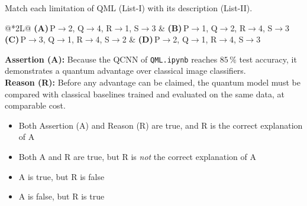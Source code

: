 \documentclass[11pt,a4paper]{article}
\newcommand{\optlabel}[1]{\textbf{(#1)}}
\newenvironment{qitem}[1]{\begin{list}{}{\setlength{\leftmargin}{3.3em}\setlength{\labelwidth}{3.1em}%
  \setlength{\labelsep}{0.2em}\setlength{\topsep}{3pt}\setlength{\parsep}{3pt}}\item[\textbf{Q.#1}\hfill]}{\end{list}}
\newcommand{\qsep}{\par\vspace{2pt}{\color{black!15}\hrule}\vspace{4pt}}
\begin{document}
\begin{qitem}{76}
Match each limitation of QML (List-I) with its description (List-II).
\par\smallskip{}
\par\smallskip\noindent\begin{tabularx}{\linewidth}{@{}*{2}{L}@{}}
\optlabel{A}\,P$\to$2, Q$\to$4, R$\to$1, S$\to$3 & \optlabel{B}\,P$\to$1, Q$\to$2, R$\to$4, S$\to$3 \\[3pt]
\optlabel{C}\,P$\to$3, Q$\to$1, R$\to$4, S$\to$2 & \optlabel{D}\,P$\to$2, Q$\to$1, R$\to$4, S$\to$3
\end{tabularx}
\end{qitem}
\qsep

\begin{qitem}{77}
\textbf{Assertion (A):} Because the QCNN of \texttt{QML.ipynb} reaches $85\,\%$ test accuracy, it demonstrates a quantum advantage
over classical image classifiers.\\[1mm]
\textbf{Reason (R):} Before any advantage can be claimed, the quantum model must be compared with classical baselines trained and
evaluated on the same data, at comparable cost.
\begin{itemize}[leftmargin=2.6em, labelsep=0.4em, itemsep=2pt, topsep=3pt]
\item[\optlabel{A}] Both Assertion (A) and Reason (R) are true, and R is the correct explanation of A
\item[\optlabel{B}] Both A and R are true, but R is \emph{not} the correct explanation of A
\item[\optlabel{C}] A is true, but R is false
\item[\optlabel{D}] A is false, but R is true
\end{itemize}
\end{qitem}
\qsep
\end{document}
